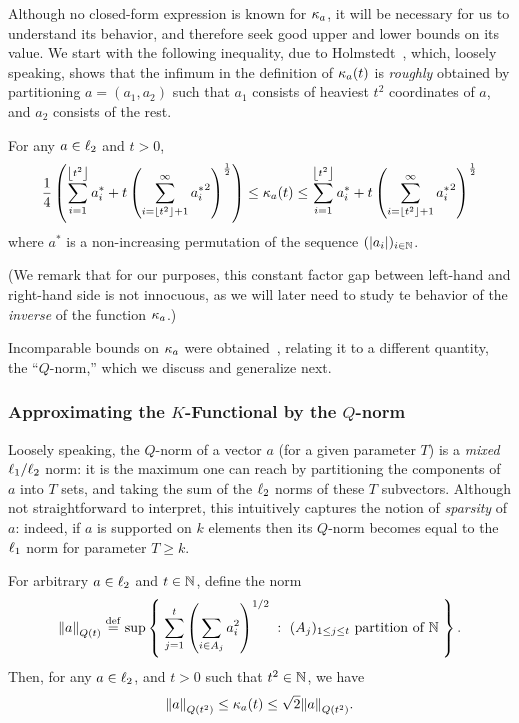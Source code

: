 Although no closed-form expression is known for $\kf{a}$, it will be necessary for us to understand its behavior, and therefore seek good upper and lower bounds on its value. We start with the following inequality, due to Holmstedt~\cite{Holm:70}, which, loosely speaking, shows that the infimum in the definition of $\kf{a}(t)$ is \emph{roughly} obtained by partitioning $a = (a_1,a_2)$ such that $a_1$ consists of heaviest $t^2$ coordinates of $a$, and $a_2$ consists of the rest.
\begin{proposition}\label{theo:bounds:kf}
For any $a\in\lp[2]$ and $t > 0$,
  \begin{equation}
    \frac{1}{4}\left( \sum_{i=1}^{\flr{t^2}} a^\ast_i + t\left( \sum_{i=\flr{t^2}+1}^\infty {a^\ast_i}^2 \right)^{\frac{1}{2}} \right)
    \leq \kf{a}(t)
    \leq \sum_{i=1}^{\flr{t^2}} a^\ast_i + t\left( \sum_{i=\flr{t^2}+1}^\infty {a^\ast_i}^2 \right)^{\frac{1}{2}}
  \end{equation}
where $a^\ast$ is a non-increasing permutation of the sequence $(\abs{a_i})_{i\in\N}$.
\end{proposition}
\noindent (We remark that for our purposes, this constant factor gap between left-hand and right-hand side is not innocuous, as we will later need to study te behavior of the \emph{inverse} of the function $\kf{a}$.)\medskip

Incomparable bounds on $\kf{a}$ were obtained~\cite{MS:90}, relating it to a different quantity, the ``$Q$-norm,'' which we discuss and generalize next.

\subsubsection{Approximating the $K$-Functional by the $Q$-norm}
 Loosely speaking, the $Q$-norm of a vector $a$ (for a given parameter $T$) is a \emph{mixed} $\lp[1]/\lp[2]$ norm: it is the maximum one can reach by partitioning the components of $a$ into $T$ sets, and taking the sum of the $\lp[2]$ norms of these $T$ subvectors. Although not straightforward to interpret, this intuitively captures the notion of \emph{sparsity} of $a$: indeed, if $a$ is supported on $k$ elements then its $Q$-norm becomes equal to the $\lp[1]$ norm for parameter $T\geq k$.

\begin{proposition}\label{prop:qnorm:kf}
  For arbitrary $a\in\lp[2]$ and $t\in\N$, define the norm
  \[
    \norm{a}_{Q(t)} \eqdef \sup \setOfSuchThat{ \sum_{j=1}^t \left( \sum_{i\in A_j} a_i^2 \right)^{1/2} }{ (A_j)_{1\leq j\leq t} \text{ partition of } \N }.
  \]
  Then, for any $a\in\lp[2]$, and $t>0$ such that $t^2\in\N$, we have
  \begin{equation}\label{eq:qnorm:kf:orig}
    \norm{a}_{Q(t^2)} \leq \kf{a}(t) \leq \sqrt{2}\norm{a}_{Q(t^2)}.
  \end{equation}
\end{proposition}

